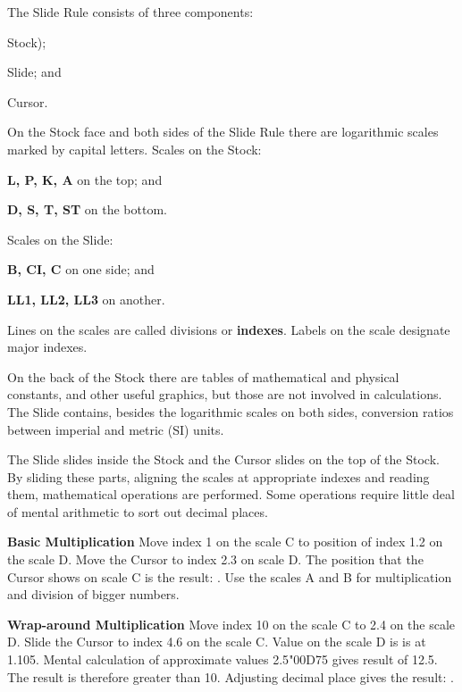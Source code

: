   \begin{multicols*}{3}
  \normalsize{
  The Slide Rule consists of three components:
    \begin{inparaenum}
      \item Stock);
      \item Slide; and
      \item Cursor.
    \end{inparaenum}

  On the Stock face and both sides of the Slide Rule there are logarithmic scales marked by capital letters. Scales on the Stock:
  \begin{inparaenum}
    \item \textbf{L, P, K, A} on the top; and
    \item \textbf{D, S, T, ST} on the bottom.
  \end{inparaenum}
  Scales on the Slide:
  \begin{inparaenum}
    \item \textbf{B, CI, C} on one side; and
    \item \textbf{LL1, LL2, LL3} on another.
  \end{inparaenum}

  Lines on the scales are called divisions or \textbf{indexes}. Labels on the scale designate major indexes.

  On the back of the Stock there are tables of mathematical and physical constants, and other useful graphics, but those are not involved in calculations. The Slide contains, besides the logarithmic scales on both sides, conversion ratios between imperial and metric (SI) units.

  The Slide slides inside the Stock and the Cursor slides on the top of the Stock. By sliding these parts, aligning the scales at appropriate indexes and reading them, mathematical operations are performed. Some operations require little deal of mental arithmetic to sort out decimal places.

  \textbf{Basic Multiplication} 
Move index 1 on the scale C to position of index 1.2 on the scale D.
Move the Cursor to index 2.3 on scale D.
The position that the Cursor shows on scale C is the result: .
\footnotesize Use the scales A and B for multiplication and division of bigger numbers. \normalsize

  \textbf{Wrap-around Multiplication} 
Move index 10 on the scale C to 2.4 on the scale D.
Slide the Cursor to index 4.6 on the scale C.
Value on the scale D is is at 1.105.
Mental calculation of approximate values 2.5{\char"00D7}5 gives result of 12.5.
The result is therefore greater than 10.
Adjusting decimal place gives the result: . 

}
\end{multicols*}
